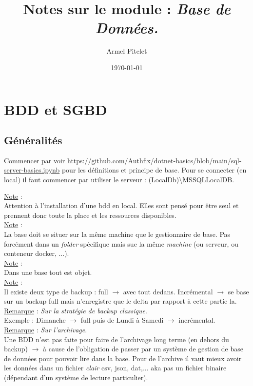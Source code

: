 \documentclass[a4paper,12pt,twoside]{article}
\title{Notes sur le module : \textit{Base de Données.}}
\author{Armel Pitelet}
\date{\today}
\newcommand{\rem}[2]{\noindent\underline{Remarque} : \textit{#1}.\\ \indent #2}
\newcommand{\note}[1]{\noindent\underline{Note} : \\ \indent #1}
\begin{document}
\maketitle
\tableofcontents

\section{BDD et SGBD}

\subsection{Généralités}

Commencer par voir \url{https://github.com/Authfix/dotnet-basics/blob/main/sql-server-basics.ipynb} pour les définitions et principe de base. Pour se connecter (en local) il faut commencer par utiliser le serveur : (LocalDb)\textbackslash MSSQLLocalDB.

\note{Attention à l'installation d'une bdd en local. Elles sont pensé pour être seul et prennent donc toute la place et les ressources disponibles.}\\

\note{La base doit se situer sur la même machine que le gestionnaire de base. Pas forcément dans un \textit{folder} spécifique mais sue la même \textit{machine} (ou serveur, ou conteneur docker, ...).}\\

\note{Dans une base tout est objet.}\\

\note{Il existe deux type de backup : full $\to$ avec tout dedans. Incrémental $\to$ se base sur un backup full mais n'enregistre que le delta par rapport à cette partie la.}\\

\rem{Sur la stratégie de backup classique}{Exemple : Dimanche $\to$ full puis de Lundi à Samedi $\to$ incrémental.}\\

\rem{Sur l'archivage}{Une BDD n'est pas faite pour faire de l'archivage long terme (en dehors du backup) $\to$ à cause de l'obligation de passer par un système de gestion de base de données pour pouvoir lire dans la base. Pour de l'archive il vaut mieux avoir les données dans un fichier \textit{clair} {csv, json, dat,...} aka pas un fichier binaire (dépendant d'un système de lecture particulier).}\\
\end{document}

